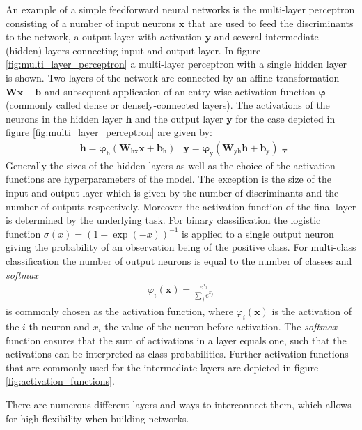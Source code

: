 An example of a simple feedforward neural networks is the multi-layer perceptron
consisting of a number of input neurons $\mathbf{x}$ that are used to feed the
discriminants to the network, a output layer with activation $\mathbf{y}$ and
several intermediate (hidden) layers connecting input and output layer. In
figure \ref{fig:multi_layer_perceptron} a multi-layer perceptron with a single
hidden layer is shown. Two layers of the network are connected by an affine
transformation $\mathbf{W}\mathbf{x} + \mathbf{b}$ and subsequent application of
an entry-wise  activation function
$\bm{\varphi}$ (commonly called dense or densely-connected layers). The
activations of the neurons in the hidden layer $\mathbf{h}$ and the output layer
$\mathbf{y}$ for the case depicted in figure \ref{fig:multi_layer_perceptron}
are given by:
\begin{align*}
  &\mathbf{h} = \bm{\varphi}_{\text{h}}(\mathbf{W}_{\text{hx}} \mathbf{x} + \mathbf{b}_{\text{h}})
  &\mathbf{y} = \bm{\varphi}_{\text{y}}(\mathbf{W}_{\text{yh}} \mathbf{h} + \mathbf{b}_{\text{y}}) \eqdot
\end{align*}
Generally the sizes of the hidden layers as well as the choice of the activation
functions are hyperparameters of the model. The exception is the size of the
input and output layer which is given by the number of discriminants and the
number of outputs respectively. Moreover the activation function of the final
layer is determined by the underlying task. For binary classification the
logistic function $\sigma(x) = (1 + \exp(-x))^{-1}$ is applied to a single
output neuron giving the probability of an observation being of the positive
class. For multi-class classification the number of output neurons is equal to
the number of classes and \emph{softmax}
\begin{align*}
  \varphi_i(\mathbf{x}) = \frac{e^{x_i}}{\sum_j e^{x_j}}
\end{align*}
is commonly chosen as the activation function, where $\varphi_i(\mathbf{x})$ is
the activation of the $i$-th neuron and $x_i$ the value of the neuron before
activation. The \emph{softmax} function ensures that the sum of activations in a
layer equals one, such that the activations can be interpreted as class
probabilities. Further activation functions that are commonly used for the
intermediate layers are depicted in figure \ref{fig:activation_functions}.

There are numerous different layers and ways to interconnect them, which allows
for high flexibility when building networks.

